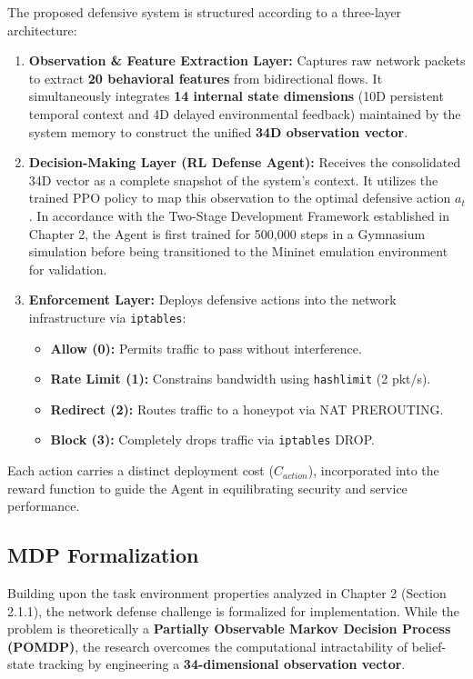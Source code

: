 \documentclass[12pt,a4paper]{report}
\begin{document}
The proposed defensive system is structured according to a three-layer architecture:
\begin{enumerate}
    \item \textbf{Observation \& Feature Extraction Layer:} Captures raw network packets to extract \textbf{20 behavioral features} from bidirectional flows. It simultaneously integrates \textbf{14 internal state dimensions} (10D persistent temporal context and 4D delayed environmental feedback) maintained by the system memory to construct the unified \textbf{34D observation vector}.
    \item \textbf{Decision-Making Layer (RL Defense Agent):} Receives the consolidated 34D vector as a complete snapshot of the system's context. It utilizes the trained PPO policy to map this observation to the optimal defensive action $a_t$. In accordance with the Two-Stage Development Framework established in Chapter 2, the Agent is first trained for 500,000 steps in a Gymnasium simulation before being transitioned to the Mininet emulation environment for validation.
    \item \textbf{Enforcement Layer:} Deploys defensive actions into the network infrastructure via \texttt{iptables}:
    \begin{itemize}
        \item \textbf{Allow (0):} Permits traffic to pass without interference.
        \item \textbf{Rate Limit (1):} Constrains bandwidth using \texttt{hashlimit} (2 pkt/s).
        \item \textbf{Redirect (2):} Routes traffic to a honeypot via NAT PREROUTING.
        \item \textbf{Block (3):} Completely drops traffic via \texttt{iptables} DROP.
    \end{itemize}
\end{enumerate}

Each action carries a distinct deployment cost ($C_{action}$), incorporated into the reward function to guide the Agent in equilibrating security and service performance.

\subsection{MDP Formalization}

Building upon the task environment properties analyzed in Chapter 2 (Section 2.1.1), the network defense challenge is formalized for implementation. While the problem is theoretically a \textbf{Partially Observable Markov Decision Process (POMDP)}, the research overcomes the computational intractability of belief-state tracking by engineering a \textbf{34-dimensional observation vector}.
\end{document}
